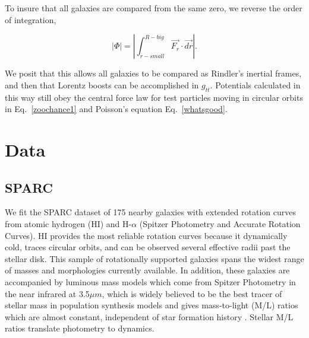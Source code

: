 \documentclass[reprint,%
 amsmath,amssymb,
 aps,
]{revtex4-1}
\begin{document}
 
   
   
 To insure that all galaxies are compared from the same zero, we reverse the order of integration,   

 \begin{equation}
    | \Phi | = \left|  \int^{R-big}_{r-small} \vec{F_r}\cdot\vec{dr}\right|.
      \label{eq:Newt2}
      \end{equation}
 
 

   We posit that this allows all galaxies to be  compared as Rindler's inertial frames, and then that Lorentz boosts can be accomplished in $g_{tt}$.
 Potentials calculated in this way still obey the central force law for test particles moving in circular orbits in Eq.~\ref{zoochance1} and Poisson's equation Eq.~\ref{whatsgood}.
   
 

 
    
% 
\section{Data \label{sec:data}}
 
 \subsection{SPARC }
 We fit the SPARC dataset  of  175 nearby galaxies with extended rotation curves from atomic hydrogen (HI)  and H-$\alpha$ (Spitzer Photometry and Accurate Rotation Curves)\cite{2016Lelli}. HI provides the most reliable
 rotation curves because it dynamically cold, traces circular orbits, and can be observed several effective radii past the stellar disk. This sample of rotationally supported galaxies   spans the widest range of masses and morphologies currently available. In addition, these galaxies are  accompanied by luminous mass models which come from   Spitzer Photometry in the 
   near infrared  at 3.5$\mu m$, which is widely believed to be the best tracer of stellar mass   in population synthesis models and   gives mass-to-light (M/L) ratios which are almost constant, independent of star formation history \cite{BelldYong,10.1093/mnras/sty3223}.  Stellar M/L ratios   translate   photometry to dynamics. 
   
\end{document}
